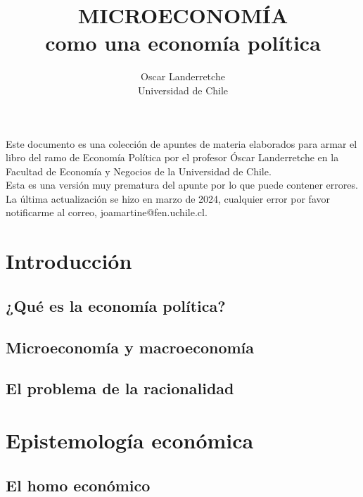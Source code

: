 \documentclass[12pt]{book}
\title{MICROECONOMÍA\\como una economía política}
\author{Oscar Landerretche\\Universidad de Chile}
\begin{document}
Este documento es una colección de apuntes de materia elaborados para armar el libro del ramo de Economía Política por el profesor Óscar Landerretche en la Facultad de Economía y Negocios de la Universidad de Chile. \\

Esta es una versión muy prematura del apunte por lo que puede contener errores. La última actualización se hizo en marzo de 2024, cualquier error por favor notificarme al correo, joamartine@fen.uchile.cl.

\maketitle        




\newpage 

\setcounter{tocdepth}{1} %
\tableofcontents

\chapter{Introducción}

\section{¿Qué es la economía política?}



\section{Microeconomía y macroeconomía}

\section{El problema de la racionalidad}

\chapter{Epistemología económica}

\section{El homo económico}
\end{document}
